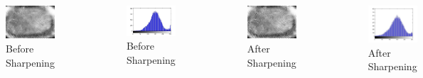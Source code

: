 \documentclass[12pt]{beamer}
\begin{document}
\subsection{}
\begin{frame}[c]
\frametitle{}
\begin{columns}[t]
 \begin{figure}
 \centering
 \includegraphics[width=4cm]{./sh1.jpg}
 \vskip-10pt
 \caption{Before Sharpening}
\end{figure}
 \begin{figure}
 \centering
 \vskip-20pt
 \includegraphics[width=4cm]{./sh3.jpg}
 \vskip-10pt
 \caption{Before Sharpening}
\end{figure}
 \begin{figure}
 \centering
 \includegraphics[width=4cm]{./sh2.jpg}
 \vskip-10pt
 \caption{After Sharpening}
\end{figure}
 \begin{figure}
 \centering
 \vskip-20pt
 \includegraphics[width=3.2cm]{./sh4.jpg}
 \vskip-10pt
 \caption{After Sharpening}
\end{figure}
\end{columns}

\end{frame}
\end{document}
